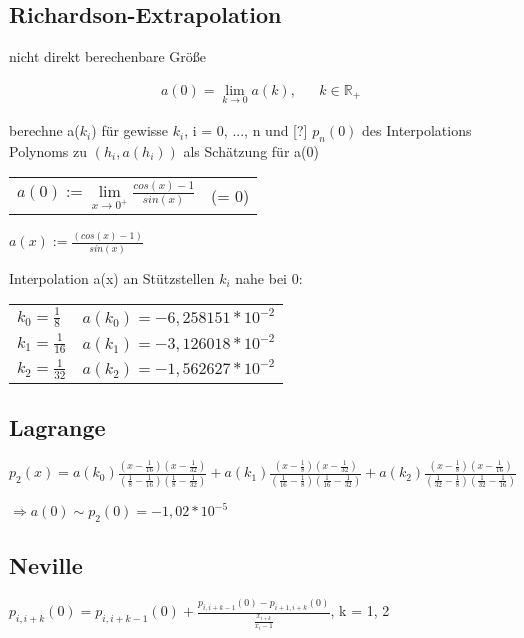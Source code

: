 \documentclass[12pt,a4paper]{article} %
\begin{document}
	\subsection{Richardson-Extrapolation}
	
	nicht direkt berechenbare Größe
	
	\begin{align*}
		a(0) = \lim\limits_{k\rightarrow 0}a(k), && k \in \mathbb{R}_+
	\end{align*}
	
	berechne a($k_i$) für gewisse $k_i$, i = 0, ..., n und [?] $p_n(0)$ des Interpolations Polynoms zu $(h_i, a(h_i))$ als Schätzung für a(0)
		
	\begin{tabular}{l l}
		$a(0) := \lim\limits_{x\rightarrow 0^+} \frac{cos(x) - 1}{sin(x)}$ & (= 0)
	\end{tabular}

	$a(x) := \frac{(cos(x) - 1)}{sin(x)}$
	
	Interpolation a(x) an Stützstellen $k_i$ nahe bei 0: 
	
	\begin{tabular}{l l}
		$k_0 = \frac{1}{8}$ & $a(k_0) = -6,258151 * 10^{-2}$ \\
		$k_1 = \frac{1}{16}$ & $a(k_1) = -3,126018 * 10^{-2}$ \\
		$k_2 = \frac{1}{32}$ & $a(k_2) = -1,562627 * 10^{-2}$
	\end{tabular}
	
	\subsection{Lagrange}
	
	$p_2(x) = a(k_0) \frac{(x - \frac{1}{16})(x - \frac{1}{32})}{(\frac{1}{8} - \frac{1}{16})(\frac{1}{8} - \frac{1}{32})} + a(k_1)\frac{(x - \frac{1}{8})(x - \frac{1}{32})}{(\frac{1}{16} - \frac{1}{8})(\frac{1}{16} - \frac{1}{32})} + a(k_2) \frac{(x - \frac{1}{8})(x - \frac{1}{16})}{(\frac{1}{32} - \frac{1}{8})(\frac{1}{32} - \frac{1}{16})}$
	
	$\Rightarrow a(0) \sim p_2(0) = -1,02 * 10^{-5}$
	
	\subsection{Neville}
	
	$p_{i, i + k}(0) = p_{i, i + k - 1}(0) + \frac{p_{i, i + k - 1}(0) - p_{i + 1, i + k}(0)}{\frac{x_{i + k}}{x_i - 1}}$, k = 1, 2
	
\end{document}
